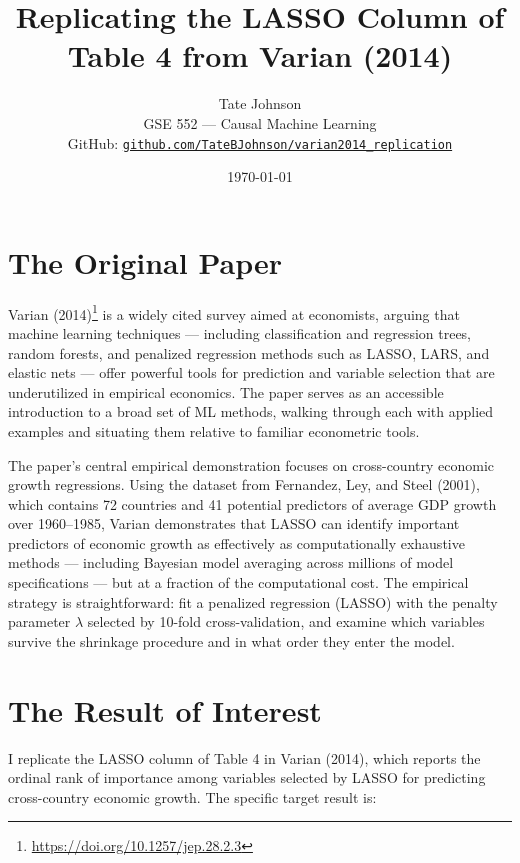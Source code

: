 \documentclass[12pt]{article}
\title{Replicating the LASSO Column of Table 4 from Varian (2014)}
\author{Tate Johnson \\ GSE 552 --- Causal Machine Learning \\[0.5em]
\small GitHub: \href{https://github.com/TateBJohnson/varian2014_replication}{\texttt{github.com/TateBJohnson/varian2014\_replication}}}
\date{\today}
\begin{document}
\maketitle

\section{The Original Paper}

Varian (2014)\footnote{\url{https://doi.org/10.1257/jep.28.2.3}} is a widely
cited survey aimed at economists, arguing that machine learning techniques ---
including classification and regression trees, random forests, and penalized
regression methods such as LASSO, LARS, and elastic nets --- offer powerful
tools for prediction and variable selection that are underutilized in empirical
economics. The paper serves as an accessible introduction to a broad set of ML
methods, walking through each with applied examples and situating them relative
to familiar econometric tools.

The paper's central empirical demonstration focuses on cross-country economic
growth regressions. Using the dataset from Fernandez, Ley, and Steel (2001),
which contains 72 countries and 41 potential predictors of average GDP growth
over 1960--1985, Varian demonstrates that LASSO can identify important
predictors of economic growth as effectively as computationally exhaustive
methods --- including Bayesian model averaging across millions of model
specifications --- but at a fraction of the computational cost. The empirical
strategy is straightforward: fit a penalized regression (LASSO) with the
penalty parameter $\lambda$ selected by 10-fold cross-validation, and examine
which variables survive the shrinkage procedure and in what order they enter
the model.

\section{The Result of Interest}

I replicate the LASSO column of Table 4 in Varian (2014), which reports the
ordinal rank of importance among variables selected by LASSO for predicting
cross-country economic growth. The specific target result is:
\end{document}
